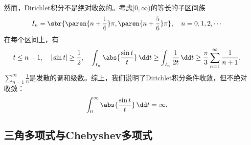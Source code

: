 然而，Dirichlet积分不是绝对收敛的。考虑$[0,\infty)$的等长的子区间族
\begin{equation}
    I_n=\sbr{\paren{n+\frac{1}{6}}\pi,\paren{n+\frac{5}{6}}\pi},\quad n=0,1,2,\cdots
\end{equation}
在每个区间上，有
\begin{equation}
    t\leq n+1,\quad |\sin t|\geq \frac{1}{2},\quad \int_{I_n}\abs{\frac{\sin t}{t}}\,\dd t \geq \int_{I_n}\frac{1}{2t}\,\dd t\geq\frac{\pi}{3}\sum_{n=1}^{\infty}\frac{1}{n+1}.
\end{equation}
$\sum_{n=1}^{\infty}\frac{1}{n}$是发散的调和级数。综上，我们说明了Dirichlet积分条件收敛，但不绝对收敛：
\begin{equation}
    \int_{0}^{\infty}\abs{\frac{\sin t}{t}}\,\dd t=\infty.
\end{equation}




\subsection{三角多项式与Chebyshev多项式}\label{sub:chebychev_polynomial}

